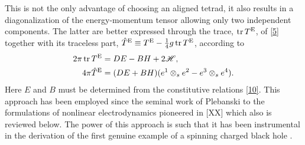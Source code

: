 This is not the only advantage of choosing an aligned tetrad, it also results in a diagonalization of the energy-momentum tensor allowing only two independent components. The latter are better expressed through the trace, $\tr T^{\rm E}$, of \eqref{5} together with its traceless part, $\hat{T}^{\rm E}\equiv T^{\rm E}-\frac{1}{4} g\tr T^{\rm E}$, according to
\begin{subequations}
	\begin{align}\label{11}
  2\pi \tr T^{\rm E}&=DE-BH+2\mathscr{H},\\
  4\pi \hat{T}^{\rm E}&=(DE+BH)(e^1\otimes_s e^2-e^3\otimes_s e^4).
\end{align}
\end{subequations}
Here $E$ and $B$ must be determined from the constitutive relations \eqref{10}. This approach has been employed since the seminal work of Plebanski \cite{Plebanski:1970zz} to the formulations of nonlinear electrodynamics pioneered in [XX] which also is reviewed below. The power of this approach is such that it has been instrumental in the derivation of the first genuine example of a spinning charged black hole \cite{Garcia-Diaz:2021bao, DiazGarcia:2022jpc, Ayon-Beato:2022dwg}.

